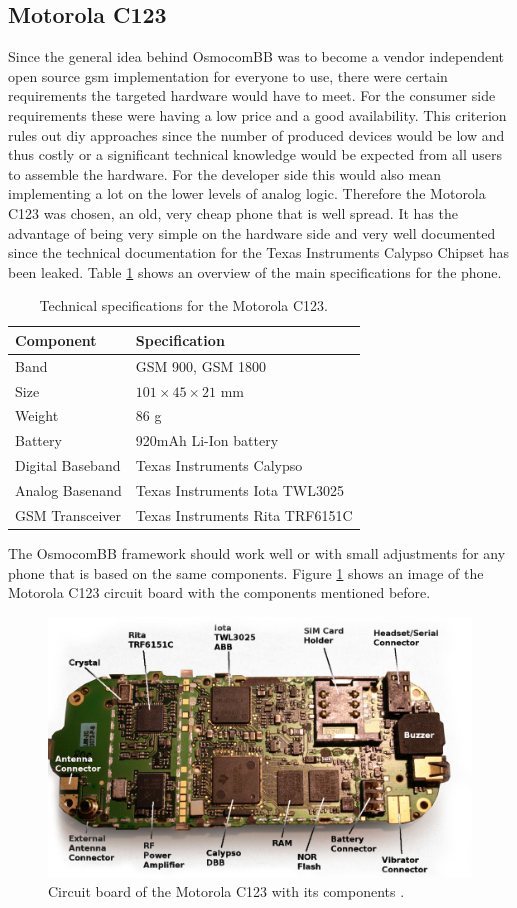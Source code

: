 \subsection{Motorola C123}
\label{sec:osmo_phones}
Since the general idea behind OsmocomBB was to become a vendor independent open source \gls{gsm} implementation for everyone to use, there were certain requirements the targeted hardware would have to meet.
For the consumer side requirements these were having a low price and a good availability.
This criterion rules out \gls{diy} approaches since the number of produced devices would be low and thus costly or a significant technical knowledge would be expected from all users to assemble the hardware.
For the developer side this would also mean implementing a lot on the lower levels of analog logic.
Therefore the Motorola C123 was chosen, an old, very cheap phone that is well spread.
It has the advantage of being very simple on the hardware side and very well documented since the technical documentation for the Texas Instruments Calypso Chipset \cite{osmo_slides} has been leaked.
Table \ref{tab:c123_specs} shows an overview of the main specifications for the phone.
\begin{table}
\centering
	\begin{tabular}{ll}
	\toprule
	Component			&Specification\\
	\midrule
	Band 				&GSM 900, GSM 1800\\
	Size				&$101\times 45\times 21$ mm\\
	Weight				&86 g\\
	Battery				&920mAh Li-Ion battery\\
	Digital Baseband	&Texas Instruments Calypso\\
	Analog Basenand		&Texas Instruments Iota TWL3025\\
	GSM Transceiver		&Texas Instruments Rita TRF6151C\\
	\bottomrule
	\end{tabular}
	\caption{Technical specifications for the Motorola C123.}
	\label{tab:c123_specs}
\end{table}
The OsmocomBB framework should work well or with small adjustments for any phone that is based on the same components.
Figure \ref{fig:osmo_c123} shows an image of the Motorola C123 circuit board with the components mentioned before.
\begin{figure}
\centering
	\includegraphics[width=.9\textwidth]{../Images/c123_pcb}
	\caption{Circuit board of the Motorola C123 with its components \cite{osmo_wiki_c123}.}
	\label{fig:osmo_c123}
\end{figure}
